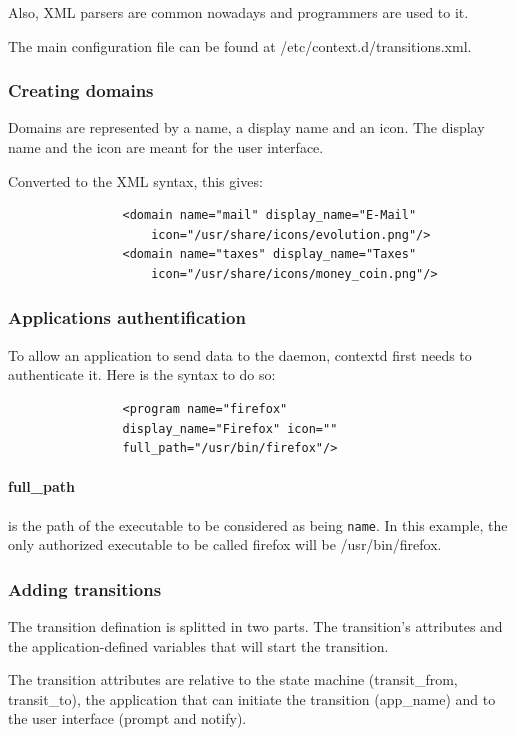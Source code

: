 \documentclass[conference]{IEEEtran}
\begin{document}
		Also, XML parsers are common nowadays and programmers are used to it.
		
		The main configuration file can be found at /etc/context.d/transitions.xml.

		\subsubsection{Creating domains}
			Domains are represented by a name, a display name and an icon. The display name and the icon are meant for the user interface.

			Converted to the XML syntax, this gives:
			\begin{verbatim}
				<domain name="mail" display_name="E-Mail" 
					icon="/usr/share/icons/evolution.png"/>
				<domain name="taxes" display_name="Taxes" 
					icon="/usr/share/icons/money_coin.png"/>
			\end{verbatim}

		\subsubsection{Applications authentification}
			To allow an application to send data to the daemon, contextd first needs to authenticate it. Here is the syntax to do so:
			\begin{verbatim}
				<program name="firefox" 
				display_name="Firefox" icon="" 
				full_path="/usr/bin/firefox"/>
			\end{verbatim}

			\paragraph*{full\_path} is the path of the executable to be considered as being \texttt{name}. 
			In this example, the only authorized executable to be called firefox will be /usr/bin/firefox.

		\subsubsection{Adding transitions}
			The transition defination is splitted in two parts. The transition's attributes and the application-defined variables that will
			start the transition.

			The transition attributes are relative to the state machine (transit\_from, transit\_to), 
			the application that can initiate the transition (app\_name) and to the user interface (prompt and notify).
\end{document}
